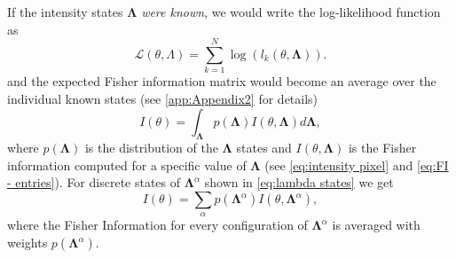 If the intensity states $\bm{\Lambda}$ \emph{were known}, we would write the log-likelihood function as 
%
\begin{equation}
	\mathcal{L}(\theta,\Lambda)=\sum_{k=1}^N\log\left(l_k(\theta,\bm{\Lambda})\right).
\end{equation}
%
and the expected Fisher information matrix would become an average over the individual known states (see \autoref{app:Appendix2} for details)
%
\begin{equation*}
	I(\theta) = \int_{\bm{\Lambda}}p(\bm{\Lambda})I(\theta,\bm{\Lambda})d\bm{\Lambda},
\end{equation*}
%
where  $p(\bm{\Lambda})$ is the distribution of the $\bm{\Lambda}$ states and $I(\theta,\bm{\Lambda})$ is the Fisher information computed for a specific value of $\bm{\Lambda}$ (see \autoref{eq:intensity pixel} and \autoref{eq:FI - entries}).
%
For discrete states of $\bm{\Lambda}^\alpha$ shown in \autoref{eq:lambda states} we get
%
\begin{equation}
	I(\theta)=\sum_{\alpha}p(\bm{\Lambda}^\alpha)I(\theta,\bm{\Lambda}^\alpha),
	\label{eq:FI avg}
\end{equation}
%
where the Fisher Information for every configuration of $\bm{\Lambda}^\alpha$ is averaged with weights $p(\bm{\Lambda}^\alpha)$. 




